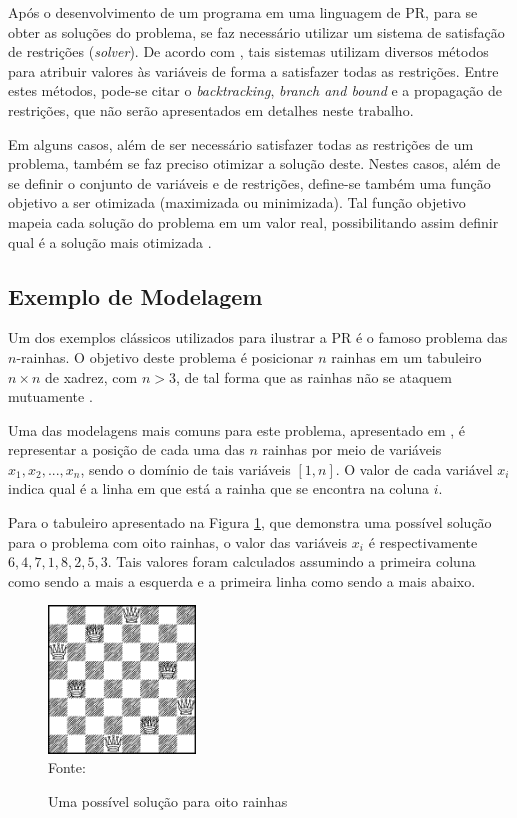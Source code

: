 Após o desenvolvimento de um programa em uma linguagem de PR, para se obter as soluções do problema, se faz necessário utilizar um sistema de satisfação de restrições (\textit{solver}). De acordo com \cite{cphandbook}, tais sistemas utilizam diversos métodos para atribuir valores às variáveis de forma a satisfazer todas as restrições. Entre estes métodos, pode-se citar o \textit{backtracking}, \textit{branch and bound} e a propagação de restrições, que não serão apresentados em detalhes neste trabalho.

Em alguns casos, além de ser necessário satisfazer todas as restrições de um problema, também se faz preciso otimizar a solução deste. Nestes casos, além de se definir o conjunto de variáveis e de restrições, define-se também uma função objetivo a ser otimizada (maximizada ou minimizada). Tal função objetivo mapeia cada solução do problema em um valor real, possibilitando assim definir qual é a solução mais otimizada \cite{apt}.

\subsection{Exemplo de Modelagem}
\label{ss:exemplo-de-modelagem}

Um dos exemplos clássicos utilizados para ilustrar a PR é o famoso problema das $n$-rainhas. O objetivo deste problema é posicionar $n$ rainhas em um tabuleiro $n \times n$ de xadrez, com $n > 3$, de tal forma que as rainhas não se ataquem mutuamente \cite{apt}.

Uma das modelagens mais comuns para este problema, apresentado em \cite{apt}, é representar a posição de cada uma das $n$ rainhas por meio de variáveis $x_1, x_2, ..., x_n$, sendo o domínio de tais variáveis $[1,n]$. O valor de cada variável $x_i$ indica qual é a linha em que está a rainha que se encontra na coluna $i$.

Para o tabuleiro apresentado na Figura \ref{fg:8-queens}, que demonstra uma possível solução para o problema com oito rainhas, o valor das variáveis $x_i$ é respectivamente $6, 4, 7, 1, 8, 2, 5, 3$. Tais valores foram calculados assumindo a primeira coluna como sendo a mais a esquerda e a primeira linha como sendo a mais abaixo.

\begin{figure}[!ht]
  \centering
  \caption{Uma possível solução para oito rainhas}
  \label{fg:8-queens}
  \includegraphics[width=0.35\textwidth]{figuras/8_queens.png}
  \\ Fonte: \cite{apt}
\end{figure}

